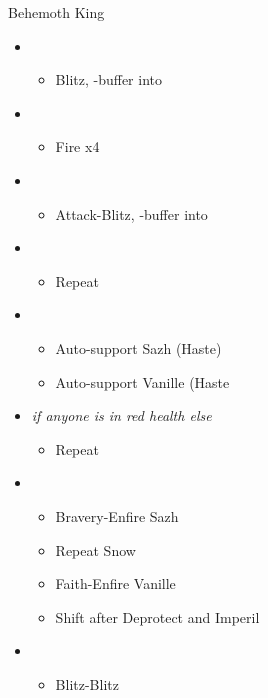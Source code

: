 \documentclass{report}
\begin{document}
\begin{battle}{Behemoth King}
\begin{itemize}
    \item \second
    \begin{itemize}
        \item Blitz, \rav-buffer into
    \end{itemize}
    \item \sixth
    \begin{itemize}
        \item Fire x4
    \end{itemize}
    \item \first
    \begin{itemize}
        \item Attack-Blitz, \rav-buffer into
    \end{itemize}
    \item \sixth
    \begin{itemize}
        \item Repeat
    \end{itemize}
    \item \fourth
    \begin{itemize}
        \item Auto-support Sazh (Haste)
        \item Auto-support Vanille (Haste
    \end{itemize}
    \item \fifth \textit{if anyone is in red health else} \sixth
    \begin{itemize}
        \item Repeat
    \end{itemize}
    \item \third
    \begin{itemize}
        \item Bravery-Enfire Sazh
        \item Repeat Snow
        \item Faith-Enfire Vanille
        \item Shift after Deprotect and Imperil
    \end{itemize}
    \item \second
    \begin{itemize}
        \item Blitz-Blitz
    \end{itemize}
\end{itemize}
\end{battle}
\end{document}
